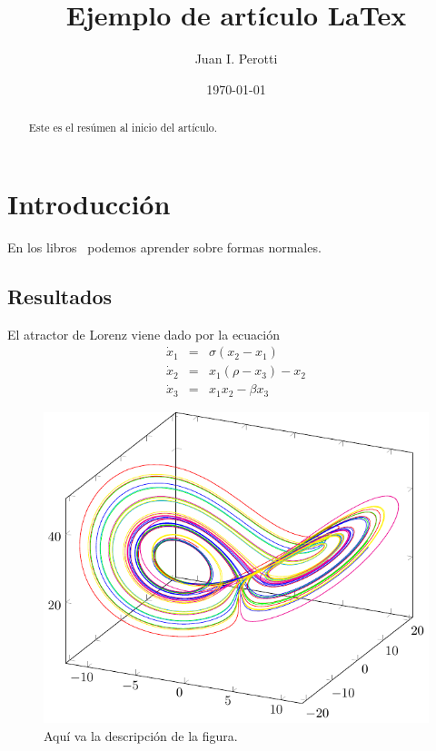 \documentclass[aps,prl,twocolumn,groupedaddress]{revtex4-2}
\begin{document}
\title{Ejemplo de artículo LaTex}

\author{Juan I. Perotti}

\date{\today}

\begin{abstract}
Este es el resúmen al inicio del artículo.
\end{abstract}

\maketitle

\section{
\label{intro}
Introducción
}

En los libros~\cite{verhulst1985nonlinear,wiggins2003introduction} podemos aprender sobre formas normales.

\subsection{
\label{resultados}
Resultados
}

El atractor de Lorenz viene dado por la ecuación
\begin{eqnarray}
\label{eq1}
\dot{x}_1 &=& \sigma(x_2-x_1) \\
\dot{x}_2 &=& x_1(\rho-x_3)-x_2 \nonumber \\
\dot{x}_3 &=& x_1x_2-\beta x_3 \nonumber
\end{eqnarray}

\begin{figure}
\includegraphics*[scale=.9]{fig1.pdf}
\caption{
\label{fig1}
Aquí va la descripción de la figura.
}
\end{figure}
\end{document}
